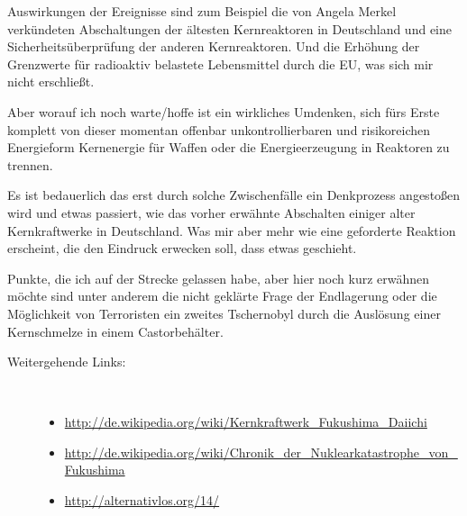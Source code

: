 \bigskip
Auswirkungen der Ereignisse sind zum Beispiel die von Angela Merkel verkündeten Abschaltungen der ältesten Kernreaktoren in
Deutschland und eine Sicherheitsüberprüfung der anderen Kernreaktoren. Und die Erhöhung der Grenzwerte für radioaktiv
belastete Lebensmittel durch die EU, was sich mir nicht erschließt.

Aber worauf ich noch warte/hoffe ist ein wirkliches Umdenken, sich fürs Erste komplett von dieser momentan offenbar
unkontrollierbaren und risikoreichen Energieform Kernenergie für Waffen oder die Energieerzeugung in Reaktoren zu trennen.

Es ist bedauerlich das erst durch solche Zwischenfälle ein Denkprozess angestoßen wird und
etwas passiert, wie das vorher erwähnte Abschalten einiger alter Kernkraftwerke in Deutschland.
Was mir aber mehr wie eine geforderte Reaktion erscheint, die den Eindruck erwecken soll, dass etwas geschieht.

\bigskip
Punkte, die ich auf der Strecke gelassen habe, aber hier noch kurz erwähnen möchte sind unter anderem die nicht geklärte
Frage
der Endlagerung oder die Möglichkeit von Terroristen ein zweites Tschernobyl durch die Auslösung einer Kernschmelze in
einem Castorbehälter.

\begin{description}
	\item[Weitergehende Links:]~
	\begin{itemize}
		\item \url{http://de.wikipedia.org/wiki/Kernkraftwerk_Fukushima_Daiichi}
		\item \url{http://de.wikipedia.org/wiki/Chronik_der_Nuklearkatastrophe_von_Fukushima}
		\item \url{http://alternativlos.org/14/}
	\end{itemize}
\end{description}
